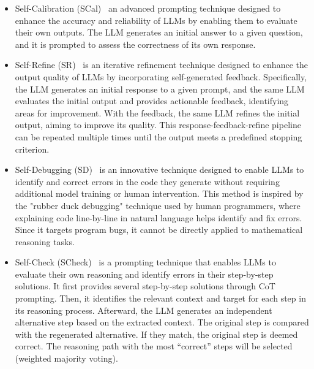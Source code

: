 \begin{itemize}
    \item Self-Calibration (SCal)~\cite{Self-Calibration}  an advanced prompting technique designed to enhance the accuracy and reliability of LLMs by enabling them to evaluate their own outputs. The LLM generates an initial answer to a given question, and it is prompted to assess the correctness of its own response.  

    \item Self-Refine (SR)~\cite{Self-Refine} is an iterative refinement technique designed to enhance the output quality of LLMs by incorporating self-generated feedback. Specifically, the LLM generates an initial response to a given prompt, and the same LLM evaluates the initial output and provides actionable feedback, identifying areas for improvement. With the feedback, the same LLM refines the initial output, aiming to improve its quality. This response-feedback-refine pipeline can be repeated multiple times until the output meets a predefined stopping criterion.

    \item Self-Debugging (SD)~\cite{Self-Debug} is an innovative technique designed to enable LLMs to identify and correct errors in the code they generate without requiring additional model training or human intervention. This method is inspired by the "rubber duck debugging" technique used by human programmers, where explaining code line-by-line in natural language helps identify and fix errors. Since it targets program bugs, it cannot be directly applied to mathematical reasoning tasks.

    \item Self-Check (SCheck)~\cite{Self-Check} is a prompting technique that enables LLMs to evaluate their own reasoning and identify errors in their step-by-step solutions. It first provides several step-by-step solutions through CoT prompting. Then, it identifies the relevant context and target for each step in its reasoning process. Afterward, the LLM generates an independent alternative step based on the extracted context. The original step is compared with the regenerated alternative. If they match, the original step is deemed correct. The reasoning path with the most ``correct'' steps will be selected (weighted majority voting).
    
\end{itemize}


